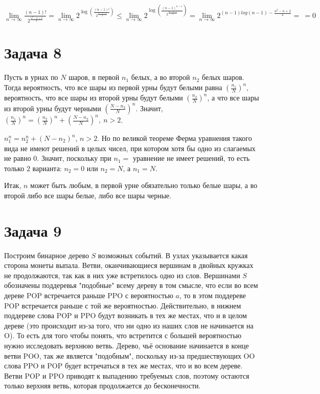 \documentclass[a4paper,12pt]{article} %
\begin{document}
$\lim\limits_{n\rightarrow\infty}\frac{(n-1)!}{2^{\frac{n^2-n+2}{2}}}
=\lim\limits_{n\rightarrow\infty}2^{\log\left(\frac{(n-1)!}{2^{\frac{n^2-n+2}{2}}}\right)}
\leq\lim\limits_{n\rightarrow\infty}2^{\log\left(\frac{(n-1)^{n-1}}{2^{\frac{n^2-n+2}{2}}}\right)}
=\lim\limits_{n\rightarrow\infty}2^{(n-1)log(n-1)-\frac{n^2-n+2}{2}}=\ =0 $


\section{Задача 8}
\hspace{5mm}
Пусть в урнах по $N$ шаров, в первой $n_1$ белых, а во второй $n_2$ белых шаров. Тогда вероятность, что все шары из первой урны будут белыми равна $(\frac{n_1}{N})^n$, вероятность, что все шары из второй урны будут белыми $(\frac{n_2}{N})^n$, а что все шары из второй урны будут черными $(\frac{N-n_2}{N})^n$. Значит, $(\frac{n_1}{N})^n=(\frac{n_2}{N})^n+(\frac{N-n_2}{N})^n,\ n>2$.

$n_1^n=n_2^n+(N-n_2)^n$, $n>2$. Но по великой теореме Ферма уравнения такого вида не имеют решений в целых чисел, при котором хотя бы одно из слагаемых не равно $0$. Значит, поскольку при $n_1=$ уравнение не имеет решений, то есть только $2$ варианта: $n_2=0$ или $n_2=N$, а $n_1=N$.

Итак, $n$ может быть любым, в первой урне обязательно только белые шары, а во второй либо все шары белые, либо все шары черные.



\section{Задача 9}
\hspace{5mm}
Построим бинарное дерево $S$ возможных событий. В узлах указывается какая сторона монеты выпала. Ветви, оканчивающиеся вершинам в двойных кружках не продолжаются, так как в них уже встретилось одно из слов. Вершинами $S$ обозначены поддеревья "подобные" всему дереву в том смысле, что если во всем дереве POP встречается раньше PPO с вероятностью $a$, то в этом поддереве POP встречается раньше с той же вероятностью. Действительно, в нижнем поддереве слова POP и PPO будут возникать в тех же местах, что и в целом дереве (это происходит из-за того, что ни одно из наших слов не начинается на O). То есть для того чтобы понять, что встретится с большей вероятностью нужно исследовать верхнюю ветвь. Дерево, чьё основание начинается в конце ветви POO, так же является "подобным", поскольку из-за предшествующих OO слова PPO и POP будет встречаться в тех же местах, что и во всем дереве. Ветви POP и PPO приводят к выпадению требуемых слов, поэтому остаются только верхняя ветвь, которая продолжается до бесконечности.
	
\end{document}
